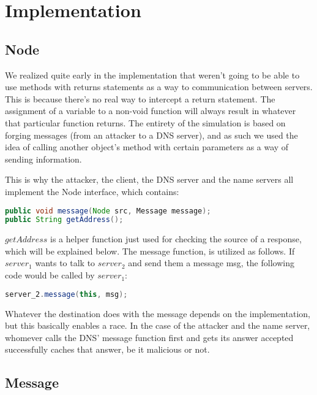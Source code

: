 \documentclass[a4paper, 12pt]{article} %
\begin{document}

\section*{Implementation}

\subsection*{Node}

We realized quite early in the implementation that weren't going to be able to use methods with returns statements as a way to communication between servers. This is because there's no real way to intercept a return statement. The assignment of a variable to a non-void function will always result in whatever that particular function returns. The entirety of the simulation is based on forging messages (from an attacker to a DNS server), and as such we used the idea of calling another object's method with certain parameters as a way of sending information. 

This is why the attacker, the client, the DNS server and the name servers all implement the Node interface, which contains:

\begin{lstlisting}[language=Java]
public void message(Node src, Message message);
public String getAddress();
\end{lstlisting}

$getAddress$ is a helper function just used for checking the source of a response, which will be explained below. The message function, is utilized as follows. If $server_1$ wants to talk to $server_2$ and send them a message msg, the following code would be called by $server_1$:

\begin{lstlisting}[language=Java]
server_2.message(this, msg);	
\end{lstlisting}

Whatever the destination does with the message depends on the implementation, but this basically enables a race. In the case of the attacker and the name server, whomever calls the DNS' message function first and gets its answer accepted successfully caches that answer, be it malicious or not.

\subsection*{Message}
\end{document}
